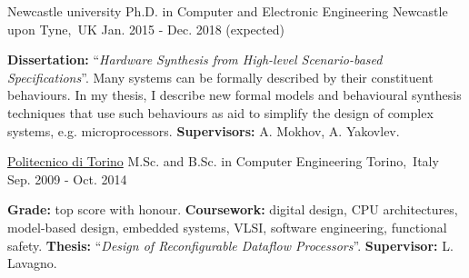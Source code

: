 
\begin{cventries}


\cventry
{Newcastle university} %
{Ph.D. in Computer and Electronic Engineering} %
{Newcastle upon Tyne,~UK} %
{Jan. 2015 - Dec. 2018 (expected)} %
{ %
\begin{cvitems}
\textbf{Dissertation:} ``\textit{Hardware Synthesis from High-level 
Scenario-based Specifications}''. Many systems can be formally described 
by their constituent behaviours. In my thesis, I describe new formal models and 
behavioural synthesis techniques that use such behaviours as aid to 
simplify the design of complex systems, e.g. microprocessors.
\textbf{Supervisors:} A. Mokhov, A. Yakovlev.
\end{cvitems}
}


\cventry
{\href{https://www.polito.it/?lang=en}{\color{myblue}Politecnico di Torino}}
{M.Sc. and B.Sc. in Computer Engineering}
{Torino,~Italy}
{Sep. 2009 - Oct. 2014}
{
\begin{cvitems}
\textbf{Grade:} top score with honour. \textbf{Coursework:} 
digital design, CPU architectures, model-based design, embedded systems, VLSI,
software engineering, functional safety. \textbf{Thesis:} 
``\emph{Design 
of Reconfigurable Dataflow Processors}''. \textbf{Supervisor:} L. Lavagno.
\end{cvitems}
}


\end{cventries}
\vspace{-1mm}